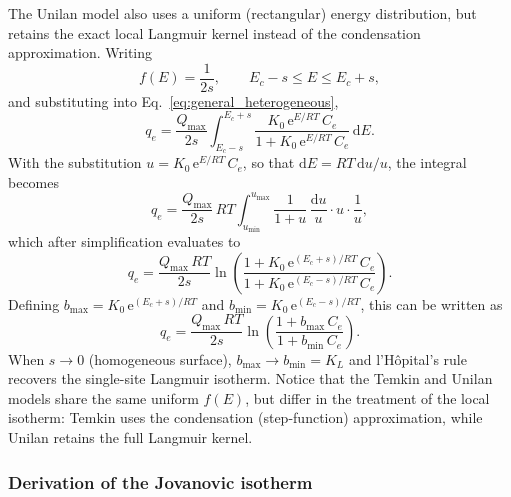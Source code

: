 \documentclass[12pt]{article}
\begin{document}
	The Unilan model also uses a uniform (rectangular) energy
	distribution, but retains the exact local Langmuir kernel instead
	of the condensation approximation. Writing
	\begin{equation}
		f(E) = \frac{1}{2s}, \qquad E_c - s \leq E \leq E_c + s,
		\label{eq:unilan_fE}
	\end{equation}
	and substituting into Eq.~\eqref{eq:general_heterogeneous},
	\begin{equation}
		q_e = \frac{Q_{\max}}{2s}
		\int_{E_c - s}^{E_c + s}
		\frac{K_0\,\mathrm{e}^{E/RT}\, C_e}
		{1 + K_0\,\mathrm{e}^{E/RT}\, C_e}\,\mathrm{d}E.
	\end{equation}
	With the substitution $u = K_0\,\mathrm{e}^{E/RT}\,C_e$, so that
	$\mathrm{d}E = RT\,\mathrm{d}u / u$, the integral becomes
	\begin{equation}
		q_e = \frac{Q_{\max}}{2s}\, RT
		\int_{u_{\min}}^{u_{\max}}
		\frac{1}{1 + u}\,\frac{\mathrm{d}u}{u}
		\cdot u \cdot \frac{1}{u},
	\end{equation}
	which after simplification evaluates to
	\begin{equation}
		q_e = \frac{Q_{\max}\,RT}{2s}
		\ln\!\left(
		\frac{1 + K_0\,\mathrm{e}^{(E_c+s)/RT}\,C_e}
		{1 + K_0\,\mathrm{e}^{(E_c-s)/RT}\,C_e}
		\right).
		\label{eq:Unilan_derived}
	\end{equation}
	Defining $b_{\max} = K_0\,\mathrm{e}^{(E_c+s)/RT}$ and
	$b_{\min} = K_0\,\mathrm{e}^{(E_c-s)/RT}$, this can be written as
	\begin{equation}
		\boxed{q_e = \frac{Q_{\max}\,RT}{2s}
		\ln\!\left(
		\frac{1 + b_{\max}\, C_e}{1 + b_{\min}\, C_e}
		\right).}
	\end{equation}
	When $s \to 0$ (homogeneous surface), $b_{\max} \to b_{\min} = K_L$
	and l'H\^opital's rule recovers the single-site Langmuir isotherm.
	Notice that the Temkin and Unilan models share the same uniform
	$f(E)$, but differ in the treatment of the local isotherm: Temkin
	uses the condensation (step-function) approximation, while Unilan
	retains the full Langmuir kernel.

	\subsubsection{Derivation of the Jovanovic isotherm}
\end{document}
